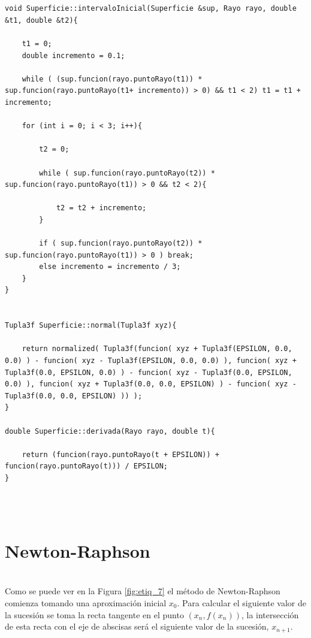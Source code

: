 \begin{lstlisting}[style=Consola]


void Superficie::intervaloInicial(Superficie &sup, Rayo rayo, double &t1, double &t2){

	t1 = 0;
	double incremento = 0.1;

	while ( (sup.funcion(rayo.puntoRayo(t1)) * sup.funcion(rayo.puntoRayo(t1+ incremento)) > 0) && t1 < 2) t1 = t1 + incremento;

	for (int i = 0; i < 3; i++){

		t2 = 0;

		while ( sup.funcion(rayo.puntoRayo(t2)) * sup.funcion(rayo.puntoRayo(t1)) > 0 && t2 < 2){

			t2 = t2 + incremento;
		}

		if ( sup.funcion(rayo.puntoRayo(t2)) * sup.funcion(rayo.puntoRayo(t1)) > 0 ) break;
		else incremento = incremento / 3;
	}
}


Tupla3f Superficie::normal(Tupla3f xyz){

	return normalized( Tupla3f(funcion( xyz + Tupla3f(EPSILON, 0.0, 0.0) ) - funcion( xyz - Tupla3f(EPSILON, 0.0, 0.0) ), funcion( xyz + Tupla3f(0.0, EPSILON, 0.0) ) - funcion( xyz - Tupla3f(0.0, EPSILON, 0.0) ), funcion( xyz + Tupla3f(0.0, 0.0, EPSILON) ) - funcion( xyz - Tupla3f(0.0, 0.0, EPSILON) )) );
}

double Superficie::derivada(Rayo rayo, double t){

	return (funcion(rayo.puntoRayo(t + EPSILON)) + funcion(rayo.puntoRayo(t))) / EPSILON;
}

\end{lstlisting}
${ }$\\



${ }$\\
\section{Newton-Raphson}
${ }$\\

Como se puede ver en la Figura \ref{fig:etiq_7} el método de Newton-Raphson comienza tomando una aproximación inicial $x_0$. Para calcular el siguiente valor de la sucesión se toma la recta tangente en el punto $(x_n, f(x_n))$, la intersección de esta recta con el eje de abscisas será el siguiente valor de la sucesión, $x_{n+1}$.
${ }$\\


